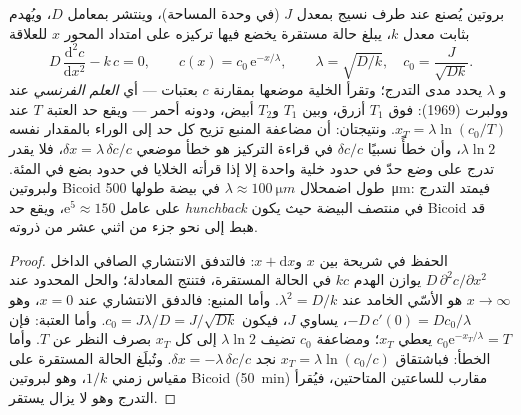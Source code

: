 \begin{theorem}\label{thm:b3:developmental-genetics:gradient}
بروتين يُصنع عند طرف نسيج بمعدل $J$ (في وحدة المساحة)،
وينتشر بمعامل $D$، ويُهدم بثابت معدل $k$، يبلغ حالة مستقرة
يخضع فيها تركيزه على امتداد المحور $x$ للعلاقة
\[
D\,\frac{\mathrm{d}^{2}c}{\mathrm{d}x^{2}} - k\,c = 0,
\qquad c(x) = c_{0}\,\mathrm{e}^{-x/\lambda}, \qquad \lambda = \sqrt{D/k},
\quad c_{0} = \frac{J}{\sqrt{Dk}} .
\]
و\emph{} $\lambda$ يحدد مدى التدرج؛ وتقرأ الخلية
موضعها بمقارنة $c$ بعتبات --- أي \emph{العلم الفرنسي} عند
وولبرت (1969): فوق $T_{1}$ أزرق، وبين $T_{1}$ و$T_{2}$ أبيض،
ودونه أحمر --- ويقع حد العتبة $T$ عند
$x_{T} = \lambda\ln(c_{0}/T)$. ونتيجتان: أن مضاعفة المنبع تزيح
كل حد إلى الوراء بالمقدار نفسه $\lambda\ln 2$، وأن خطأً نسبيًا
$\delta c/c$ في قراءة التركيز هو خطأ موضعي
$\delta x = \lambda\,\delta c/c$، فلا يقدر تدرج على وضع حدّ
في حدود خلية واحدة إلا إذا قرأته الخلايا في حدود بضع في
المئة. ولبروتين Bicoid طول اضمحلال $\lambda \approx \qty{100}{\micro m}$
في بيضة طولها \qty{500}{\micro m}: فيمتد التدرج على عامل
$\mathrm{e}^{5}
\approx 150$، ويقع حد \emph{hunchback} في منتصف
البيضة حيث يكون Bicoid قد هبط إلى نحو جزء من اثني عشر من
ذروته.
\end{theorem}
\begin{proof}
الحفظ في شريحة بين $x$ و$x + \mathrm{d}x$: فالتدفق الانتشاري
الصافي الداخل $D\,\partial^{2}c/\partial x^{2}$ يوازن
الهدم $kc$ في الحالة المستقرة، فتنتج المعادلة؛ والحل المحدود
عند $x \to \infty$ هو الأسّي الخامد عند
$\lambda^{2} = D/k$. وأما المنبع: فالدفق الانتشاري عند $x = 0$، وهو $-D\,
c'(0) = Dc_{0}/\lambda$، يساوي $J$، فيكون $c_{0} = J\lambda/D =
J/\sqrt{Dk}$. وأما العتبة: فإن $c_{0}\mathrm{e}^{-x_{T}/\lambda} = T$ يعطي
$x_{T}$؛ ومضاعفة $c_{0}$ تضيف $\lambda\ln 2$ إلى كل $x_{T}$
بصرف النظر عن $T$. وأما الخطأ: فباشتقاق $x_{T} = \lambda\ln(c_{0}/c)$
نجد $\delta x = -\lambda\,\delta c/c$. وتُبلَغ الحالة المستقرة
على مقياس زمني $1/k$، وهو لبروتين Bicoid (\qty{50}{min}) مقارب
للساعتين المتاحتين، فيُقرأ التدرج وهو لا يزال يستقر.
\end{proof}

